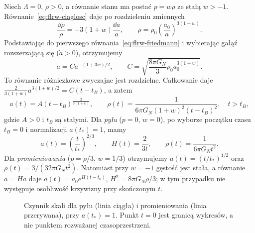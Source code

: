 \begin{przyklad}
\label{prz:flrw-rozwiazanie-ode}
Niech $\Lambda=0$, $\rho>0$, a równanie stanu ma postać
$p=w\rho$ ze stałą $w>-1$. Równanie~\eqref{eq:flrw-ciaglosc}
daje po rozdzieleniu zmiennych
\[
 \frac{\dd\rho}{\rho}=-3(1+w)\frac{\dd a}{a},
 \qquad \rho=\rho_0\left(\frac{a_0}{a}\right)^{3(1+w)}.
\]
Podstawiając do pierwszego równania~\eqref{eq:flrw-friedmann}
i wybierając gałąź rozszerzającą się ($\dot a>0$), otrzymujemy
\[
 \dot a=C a^{-(1+3w)/2},\qquad
 C=\sqrt{\frac{8\pi G_{\!N}}{3}\rho_0a_0^{3(1+w)}}.
\]
To równanie różniczkowe zwyczajne jest rozdzielne.
Całkowanie daje
$\frac{2}{3(1+w)}a^{3(1+w)/2}=C(t-t_B)$,
a zatem
\begin{equation}\label{eq:flrw-power-law}
 a(t)=A(t-t_B)^{\frac{2}{3(1+w)}},\qquad
 \rho(t)=\frac{1}{6\pi G_{\!N}(1+w)^2(t-t_B)^2},
 \quad t>t_B,
\end{equation}
gdzie $A>0$ i $t_B$ są stałymi.
Dla \emph{pyłu} ($p=0$, $w=0$), po wyborze początku czasu
$t_B=0$ i normalizacji $a(t_*)=1$, mamy
\begin{equation}\label{eq:flrw-dust}
 a(t)=\left(\frac{t}{t_*}\right)^{2/3},\qquad
 H(t)=\frac{2}{3t},\qquad
 \rho(t)=\frac{1}{6\pi G_{\!N}t^2}.
\end{equation}
Dla \emph{promieniowania} ($p=\rho/3$, $w=1/3$)
otrzymujemy $a(t)=(t/t_*)^{1/2}$ oraz
$\rho(t)=3/(32\pi G_{\!N}t^2)$.
Natomiast przy $w=-1$ gęstość jest stała, a równanie
$\dot a=Ha$ daje $a(t)=a_0e^{H(t-t_0)}$,
$H^2=8\pi G_{\!N}\rho/3$; w tym przypadku
nie występuje osobliwość krzywizny przy skończonym $t$.

\begin{figure}[htbp]
\centering
{}
\caption{Czynnik skali dla pyłu (linia ciągła) i promieniowania
(linia przerywana), przy $a(t_*)=1$. Punkt $t=0$ jest granicą
wykresów, a nie punktem rozważanej czasoprzestrzeni.}
\label{fig:flrw-skala}
\end{figure}
\end{przyklad}

